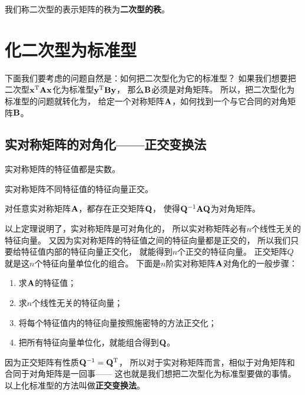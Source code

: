 \begin{definition}[二次型的秩]
  我们称二次型的表示矩阵的秩为\textbf{二次型的秩}。
\end{definition}

\section{化二次型为标准型}
下面我们要考虑的问题自然是：如何把二次型化为它的标准型？
如果我们想要把二次型$\mathbf{x}^{\textrm{T}}\mathbf{A}\mathbf{x}$化为标准型$\mathbf{y}^{\textrm{T}}\mathbf{B}\mathbf{y}$，
那么$\mathbf{B}$必须是对角矩阵。
所以，把二次型化为标准型的问题就转化为，
给定一个对称矩阵$\mathbf{A}$，如何找到一个与它合同的对角矩阵$\mathbf{B}$。

\subsection{实对称矩阵的对角化——正交变换法}
\begin{theorem}
  实对称矩阵的特征值都是实数。
\end{theorem}

\begin{theorem}
  实对称矩阵不同特征值的特征向量正交。
\end{theorem}

\begin{theorem}[实对称矩阵的可对角化]
  对任意实对称矩阵$\mathbf{A}$，都存在正交矩阵$\mathbf{Q}$，
  使得$\mathbf{Q}^{-1}\mathbf{A}\mathbf{Q}$为对角矩阵。
\end{theorem}

以上定理说明了，实对称矩阵是可对角化的，
所以实对称矩阵必有$n$个线性无关的特征向量。
又因为实对称矩阵的特征值之间的特征向量都是正交的，
所以我们只要给特征值内部的特征向量正交化，
就能得到$n$个正交的特征向量。
正交矩阵$Q$就是这$n$个特征向量单位化的组合。
下面是$n$阶实对称矩阵$\mathbf{A}$对角化的一般步骤：
\begin{enumerate}
  \item
  求$\mathbf{A}$的特征值；
  \item
  求$n$个线性无关的特征向量；
  \item
  将每个特征值内的特征向量按照施密特的方法正交化；
  \item
  把所有特征向量单位化，就能组合得到$\mathbf{Q}$。
\end{enumerate}

\begin{remark}
  因为正交矩阵有性质$\mathbf{Q}^{-1}=\mathbf{Q}^{\textrm{T}}$，
  所以对于实对称矩阵而言，相似于对角矩阵和合同于对角矩阵是一回事——
  这也就是我们想把二次型化为标准型要做的事情。
  以上化标准型的方法叫做\textbf{正交变换法}。
\end{remark}

